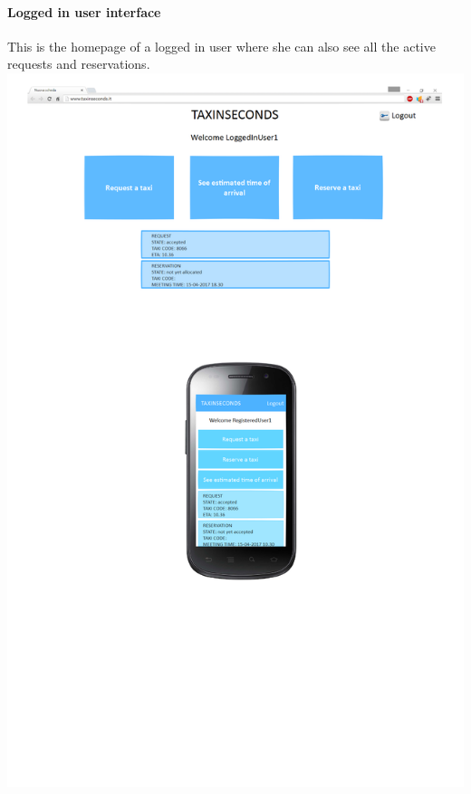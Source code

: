 \documentclass{article}
\begin{document}
\paragraph{Logged in user interface}
This is the homepage of a logged in user where she can also see all the active requests and reservations.
\includegraphics{Logged in user interface}
\clearpage
\end{document}
